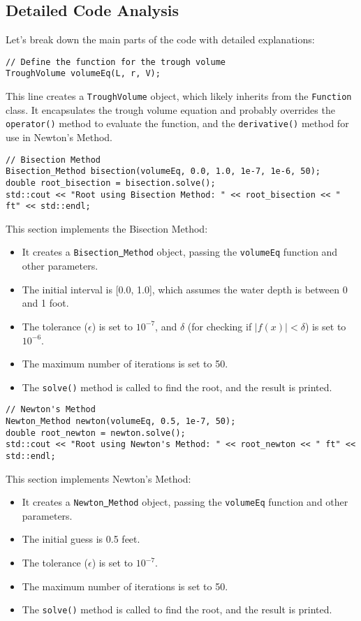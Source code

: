 \documentclass{article}
\begin{document}
\subsection{Detailed Code Analysis}
Let's break down the main parts of the code with detailed explanations:
\begin{lstlisting}
// Define the function for the trough volume
TroughVolume volumeEq(L, r, V);
\end{lstlisting}
This line creates a \texttt{TroughVolume} object, which likely inherits from the \texttt{Function} class. It encapsulates the trough volume equation and probably overrides the \texttt{operator()} method to evaluate the function, and the \texttt{derivative()} method for use in Newton's Method.
\begin{lstlisting}
// Bisection Method
Bisection_Method bisection(volumeEq, 0.0, 1.0, 1e-7, 1e-6, 50);
double root_bisection = bisection.solve();
std::cout << "Root using Bisection Method: " << root_bisection << " ft" << std::endl;
\end{lstlisting}
This section implements the Bisection Method:
\begin{itemize}
\item It creates a \texttt{Bisection\underline{~}Method} object, passing the \texttt{volumeEq} function and other parameters.
\item The initial interval is [0.0, 1.0], which assumes the water depth is between 0 and 1 foot.
\item The tolerance ($\epsilon$) is set to $10^{-7}$, and $\delta$ (for checking if $|f(x)| < \delta$) is set to $10^{-6}$.
\item The maximum number of iterations is set to 50.
\item The \texttt{solve()} method is called to find the root, and the result is printed.
\end{itemize}
\begin{lstlisting}
// Newton's Method
Newton_Method newton(volumeEq, 0.5, 1e-7, 50);
double root_newton = newton.solve();
std::cout << "Root using Newton's Method: " << root_newton << " ft" << std::endl;
\end{lstlisting}
This section implements Newton's Method:
\begin{itemize}
\item It creates a \texttt{Newton\underline{~}Method} object, passing the \texttt{volumeEq} function and other parameters.
\item The initial guess is 0.5 feet.
\item The tolerance ($\epsilon$) is set to $10^{-7}$.
\item The maximum number of iterations is set to 50.
\item The \texttt{solve()} method is called to find the root, and the result is printed.
\end{itemize}
\end{document}
